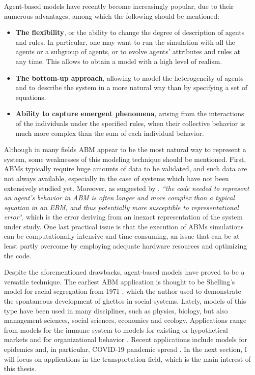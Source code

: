 Agent-based models have recently become increasingly popular, due to their numerous advantages, among which the following should be mentioned:
\begin{itemize}
    \item \textbf{The flexibility}, or the ability to change the degree of description of agents and rules. In particular, one may want to run the simulation with all the agents or a subgroup of agents, or to evolve agents' attributes and rules at any time. This allows to obtain a model with a high level of realism. 
    \item \textbf{The bottom-up approach}, allowing to model the heterogeneity of agents and to describe the system in a more natural way than by specifying a set of equations.
    \item \textbf{Ability to capture emergent phenomena}, arising from the interactions of the individuals under the specified rules, when their collective behavior is much more complex than the sum of each individual behavior. 
\end{itemize}
Although in many fields ABM appear to be the most natural way to represent a system, some weaknesses of this modeling technique should be mentioned. First, ABMs typically require huge amounts of data to be validated, and such data are not always available, especially in the case of systems which have not been extensively studied yet. Moreover, as suggested by \textcite{parunak}, \textit{``the code needed to represent an agent’s behavior in ABM is often longer and more complex than a typical equation in an EBM, and thus potentially more susceptible to representational error"}, which is the error deriving from an inexact representation of the system under study. One last practical issue is that the execution of ABMs simulations can be computationally intensive and time-consuming, an issue that can be at least partly overcome by employing adequate hardware resources and optimizing the code. 

Despite the aforementioned drawbacks, agent-based models have proved to be a versatile technique. The earliest ABM application is thought to be Shelling's model for racial segregation from 1971 \cite{shelling71}, which the author used to demonstrate the spontaneous development of ghettos in social systems. Lately, models of this type have been used in many disciplines, such as physics, biology, but also management sciences, social sciences, economics and ecology. Applications range from models for the immune system \cite{Folcik2007TheBI} to models for existing or hypothetical markets \cite{Charania2006SubOrbitalST, markets2, market3} and for organizational behavior \cite{organization}. Recent applications include models for epidemics and, in particular, COVID-19 pandemic spread \cite{covid1, covid2, covid3}. In the next section, I will focus on applications in the transportation field, which is the main interest of this thesis.


